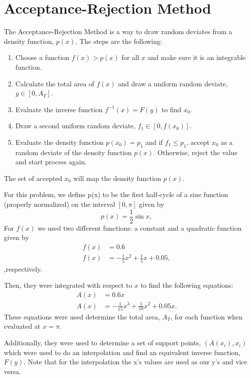 \section{Acceptance-Rejection Method}

The Acceptance-Rejection Method is a way to draw random deviates from a density function, $p(x)$. The steps are the following:
\begin{enumerate}
    \item Choose a function $f(x) > p(x)$ for all $x$ and make sure it is an integrable function.
    \item Calculate the total area of $f(x)$ and draw a uniform random deviate,$y \in [0,A_T]$.
    \item Evaluate the inverse function $f^{-1}(x)=F(y)$ to find $x_0$.
    \item Draw a second uniform random deviate, $f_1 \in[0,f(x_0)]$.
    \item Evaluate the density function $p(x_0)=p_1$ and if $f_1\leq p_1$, accept $x_0$ as a random deviate of the density function $p(x)$. Otherwise, reject the value and start process again.
\end{enumerate}

The set of accepted $x_0$ will map the density function $p(x)$. 

For this problem, we define p(x) to be the first half-cycle of a sine function (properly normalized) on the interval $[0,\pi]$ given by
\begin{equation}
    p(x)=\frac{1}{2}\sin{x},
    \label{eq:sinProb}
\end{equation}
For $f(x)$ we used two different functions: a constant and a quadratic function given by 
\begin{align}
    f(x)&=0.6\\
    f(x)&=-\frac{1}{5}x^2 + \frac{1}{5}x+0.05,
\end{align}
,respectively.

Then, they were integrated with respect to $x$ to find the following equations:
\begin{align}
    A(x)&=0.6x\\
    A(x)&=-\frac{1}{15}x^3 + \frac{1}{10}x^2 + 0.05x.
\end{align}
These equations were used determine the total area, $A_T$, for each function when evaluated at $x=\pi$. 

Additionally, they were used to determine a set of support points, $(A(x_i),x_i)$ which were used to do an interpolation and find an equivalent inverse function, $F(y)$. Note that for the interpolation the x's values are used as our y's and vice versa. 

